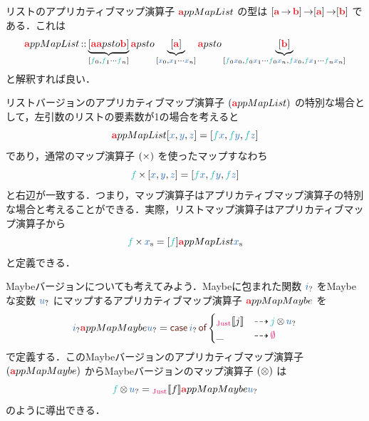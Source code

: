 \documentclass[a5paper,twoside,fleqn,draft]{jsbook}
\begin{document}
リストのアプリカティブマップ演算子 $\hTypeName{a}ppMapList$ の型は
$[\hTypeName{a}\hFunctionArrow\hTypeName{b}]\hFunctionArrow\hListConstruct{\hTypeName{a}}\hFunctionArrow[\hTypeName{b}]$ である．これは
\begin{equation}
  \hTypeName{a}ppMapList
  \hIsTypeOf\underbrace{[\hTypeName{a}\hTypeName{a}psto\hTypeName{b}]}_{[\hFunc{f}_0,\hFunc{f}_1\dotsb \hFunc{f}_n]}
  \hTypeName{a}psto\underbrace{\hListConstruct{\hTypeName{a}}}_{[\hVar{x}_0,\hVar{x}_1\dotsb \hVar{x}_n]}
  \hTypeName{a}psto\underbrace{[\hTypeName{b}]}_{[\hFunc{f}_0\hVar{x}_0,\hFunc{f}_0\hVar{x}_1\dotsb \hFunc{f}_0\hVar{x}_n,\hFunc{f} \hVar{x}_0,\hFunc{f} \hVar{x}_1\dotsb \hFunc{f}_n\hVar{x}_n]}
\end{equation}
と解釈すれば良い．

リストバージョンのアプリカティブマップ演算子 $(\hTypeName{a}ppMapList)$ の特別な場合として，左引数のリストの要素数が1の場合を考えると
\begin{equation}
  [\hFunc{f}]\hTypeName{a}ppMapList{}[\hVar{x},\hVar{y},\hVar{z}]
  =[\hFunc{f}\hVar{x},\hFunc{f}\hVar{y},\hFunc{f}\hVar{z}]
\end{equation}
であり，通常のマップ演算子 $(\operatorname{\times})$ を使ったマップすなわち
\begin{equation}
  \hFunc{f}\hMap{}[\hVar{x},\hVar{y},\hVar{z}]
  =[\hFunc{f}\hVar{x},\hFunc{f}\hVar{y},\hFunc{f}\hVar{z}]
\end{equation}
と右辺が一致する．つまり，マップ演算子はアプリカティブマップ演算子の特別な場合と考えることができる．実際，リストマップ演算子はアプリカティブマップ演算子から
\begin{equation}
  \hFunc{f}\hMap\hListVar{x}
  =[\hFunc{f}]\hTypeName{a}ppMapList\hListVar{x}
\end{equation}
と定義できる．

Maybeバージョンについても考えてみよう．Maybeに包まれた関数 $\hMaybeVar{i}$ をMaybeな変数 $\hMaybeVar{u}$ にマップするアプリカティブマップ演算子
$\hTypeName{a}ppMapMaybe$ を
\begin{equation}
  \hMaybeVar{i}\hTypeName{a}ppMapMaybe\hMaybeVar{u}
  =\hCaseSyntax{\hMaybeVar{i}}
  \begin{cases}
    \hJustWith{j}
    &\hIfSo\mJFunc\hFunctorMap\hMaybeVar{u}\\
    \_
    &\hIfSo\hNothing
  \end{cases}
\end{equation}
で定義する．このMaybeバージョンのアプリカティブマップ演算子 $(\hTypeName{a}ppMapMaybe)$ からMaybeバージョンのマップ演算子 $(\operatorname{\otimes})$ は
\begin{equation}
  \hFunc{f}\hFunctorMap\hMaybeVar{u}
  =\hJustWith{f}\hTypeName{a}ppMapMaybe\hMaybeVar{u}
\end{equation}
のように導出できる．
\end{document}
